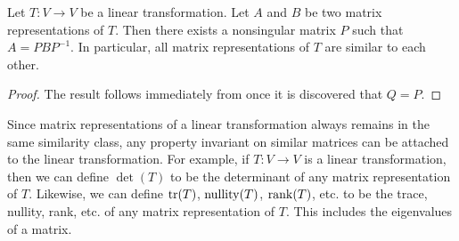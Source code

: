 \begin{Cor} Let $T : V \to V$ be a linear transformation. Let $A$ and $B$ be two matrix representations of $T$. Then there exists a nonsingular matrix $P$ such that $A = PBP^{-1}$. In particular, all matrix representations of $T$ are similar to each other.
\end{Cor}
\begin{proof} The result follows immediately from  once it is discovered that $Q=P$.\end{proof}\vs

Since matrix representations of a linear transformation always remains in the same similarity class, any property invariant on similar matrices can be attached to the linear transformation. For example, if $T : V \to V$ is a linear transformation, then we can define $\det(T)$ to be the determinant of any matrix representation of $T$. Likewise, we can define $\operatorname*{tr}(T)$, $\operatorname*{nullity}(T)$,  $\operatorname*{rank}(T)$, etc. to be the trace, nullity, rank, etc. of any matrix representation of $T$. This includes the eigenvalues of a matrix.\\

